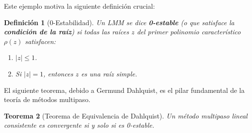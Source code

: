 \documentclass[a4paper,11pt]{report}
\newtheorem{theorem}{Teorema}[chapter]
\newtheorem{definition}[theorem]{Definición}
\begin{document}
Este ejemplo motiva la siguiente definición crucial:

\begin{definition}[0-Estabilidad]
Un LMM se dice \textbf{0-estable} (o que satisface la \textbf{condición de la raíz}) si todas las raíces $z$ del primer polinomio característico $\rho(z)$ satisfacen:
\begin{enumerate}
    \item $|z| \leq 1$.
    \item Si $|z| = 1$, entonces $z$ es una raíz simple.
\end{enumerate}
\end{definition}

El siguiente teorema, debido a Germund Dahlquist, es el pilar fundamental de la teoría de métodos multipaso.

\begin{theorem}[Teorema de Equivalencia de Dahlquist]
Un método multipaso lineal consistente es convergente si y solo si es 0-estable.
\end{theorem}
\end{document}
